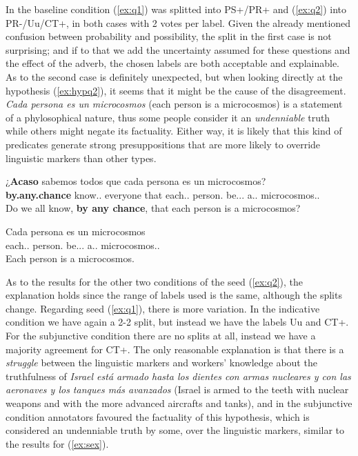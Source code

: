 In the baseline condition (\ref{ex:q1}) was splitted into PS+/PR+ and (\ref{ex:q2}) into PR-/Uu/CT+, in both cases with 2 votes per label. Given the already mentioned confusion between probability and possibility, the split in the first case is not surprising; and if to that we add the uncertainty assumed for these questions and the effect of the adverb, the chosen labels are both acceptable and explainable. As to the second case is definitely unexpected, but when looking directly at the hypothesis (\ref{ex:hypq2}), it seems that it might be the cause of the disagreement. \textit{Cada persona es un microcosmos} (each person is a microcosmos) is a statement of a phylosophical nature, thus some people consider it an \textit{undenniable} truth while others might negate its factuality. Either way, it is likely that this kind of predicates generate strong presuppositions that are more likely to override linguistic markers than other types.\\

\begin{exe}
    \ex\label{ex:q2}
    \begin{xlist}
      \item{\gll ¿\textbf{Acaso} sabemos todos que cada persona es un microcosmos?\\ \textbf{by.any.chance} know.\F.\Sg{} everyone that each.\F.\Sg{} person\F.\Sg{} be.\Prs.\Ind.\Tsg{} a.\M.\Sg{} microcosmos.\M.\Sg{} \\\glt Do we all know, \textbf{by any chance}, that each person is a microcosmos?}
      \item{\gll Cada persona es un microcosmos\\ each.\F.\Sg{} person\F.\Sg{} be.\Prs.\Ind.\Tsg{} a.\M.\Sg{} microcosmos.\M.\Sg{} \\\glt Each person is a microcosmos.} \label{ex:hypq2}
    \end{xlist}
\end{exe}

As to the results for the other two conditions of the seed (\ref{ex:q2}), the explanation holds since the range of labels used is the same, although the splits change. Regarding seed (\ref{ex:q1}), there is more variation. In the indicative condition we have again a 2-2 split, but instead we have the labels Uu and CT+. For the subjunctive condition there are no splits at all, instead we have a majority agreement for CT+. The only reasonable explanation is that there is a \textit{struggle} between the linguistic markers and workers' knowledge about the truthfulness of \textit{Israel está armado hasta los dientes con armas nucleares y con las aeronaves y los tanques más avanzados} (Israel is armed to the teeth with nuclear weapons and with the more advanced aircrafts and tanks), and in the subjunctive condition annotators favoured the factuality of this hypothesis, which is considered an undenniable truth by some, over the linguistic markers, similar to the results for (\ref{ex:sex}).\\

